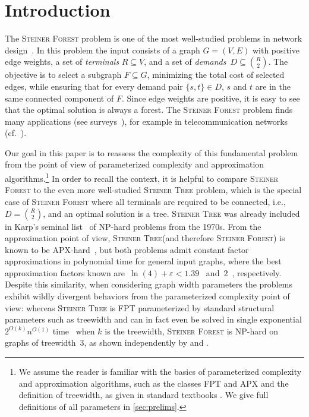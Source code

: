 \documentclass[a4paper]{article}
\let\oldcitet\citet
\renewcommand{\citet}[1]{\mbox{\oldcitet{#1}}}
\theoremstyle{plain}
\newcommand{\eps}{{\varepsilon}}
\newcommand{\pname}[1]{\textsc{#1}}
\newcommand{\SF}{\pname{Steiner Forest}\xspace}
\newcommand{\ST}{\pname{Steiner Tree}\xspace}
\begin{document}
\section{Introduction}

The \SF problem is one of the most well-studied problems in network
design~\cite{ljubic2021solving, hwang1992steiner, du2013advances,
gupta2011approximation}. In this problem the input consists of a graph
$G=(V,E)$ with positive edge weights, %
a set of \emph{terminals} $R\subseteq V$, and a set of
\emph{demands}~$D\subseteq\binom{R}{2}$. The objective is to select a subgraph
$F\subseteq G$, minimizing the total cost of selected edges, while ensuring that for every
demand pair $\{s,t\}\in D$, $s$ and $t$ are in the same connected component of
$F$.  Since edge weights are positive, it is easy to see that the optimal
solution is always a forest. The \SF problem finds many applications (see
surveys~\cite{ljubic2021solving, cheng2013steiner, voss2006steiner,
tang2020survey}), for example in telecommunication networks
(cf.~\cite{voss2006steiner}). 

Our goal in this paper is to reassess the complexity of this fundamental problem
from the point of view of parameterized complexity and approximation
algorithms.\footnote{We assume the reader is familiar with the
basics of parameterized complexity and approximation algorithms, such as the classes FPT and APX
and the definition of treewidth, as given in standard textbooks 
\cite{cygan2015parameterized,williamson2011design,feldmann2020survey}. 
We give full definitions of all parameters in \cref{sec:prelims}.}
In order to recall the context, it is helpful to compare \SF to the
even more well-studied \ST problem, which is the special case of \SF where all
terminals are required to be connected, i.e., $D=\binom{R}{2}$, and an optimal
solution is a tree. \ST was already included in Karp's seminal
list~\cite{karp1975computational} of NP-hard problems from the 1970s. From the
approximation point of view, \ST (and therefore \SF) is known to be
APX-hard~\cite{chlebik2008steiner}, but both problems admit constant factor
approximations in polynomial time for general input graphs, where the best
approximation factors known are~$\ln(4)+\eps<1.39$~\cite{byrka2013steiner}
and~$2$~\cite{agrawal1991trees, ravi1994primal}, respectively. Despite this
similarity, when considering graph width parameters the problems exhibit 
wildly divergent behaviors from the parameterized complexity point of
view: whereas \ST is FPT parameterized by standard structural parameters such
as treewidth and can in fact even be solved in single exponential
$2^{O(k)}n^{O(1)}$ time~\cite{bodlaender2015deterministic} when $k$ is the
treewidth, \SF is NP-hard on graphs of treewidth~$3$, as shown independently by
\citet{gassner2010steiner} and \citet{bateni2011approximation}.
\end{document}
